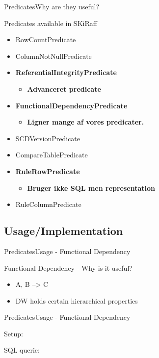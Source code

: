 \begin{frame}{Predicates}{Why are they useful?}
	\begin{block}{Predicates available in SKiRaff}
		\begin{itemize}
			\item<1-> RowCountPredicate
			\item<1-> ColumnNotNullPredicate
			\item<1-> \textbf{ReferentialIntegrityPredicate}
			\begin{itemize}
				\item<1-> \textbf{Advanceret predicate}
			\end{itemize}
			\item<1-> \textbf{FunctionalDependencyPredicate}
			\begin{itemize}
				\item<1-> \textbf{Ligner mange af vores predicater.}
			\end{itemize}
			\item<1-> SCDVersionPredicate
			\item<1-> CompareTablePredicate
			\item<1-> \textbf{RuleRowPredicate}
			\begin{itemize}
				\item<1-> \textbf{Bruger ikke SQL men representation}
			\end{itemize}
			\item<1-> RuleColumnPredicate
		\end{itemize}
	\end{block}
\end{frame}

\subsection{Usage/Implementation }
\begin{frame}{Predicates}{Usage - Functional Dependency}
	\begin{block}{Functional Dependency - Why is it useful?}
		\begin{itemize}
			\item<1-> A, B --> C
			\item<2-> DW holds certain hierarchical properties
		\end{itemize}
	\end{block}
\end{frame}

\begin{frame}{Predicates}{Usage - Functional Dependency}
	\begin{block}{Setup:}
	\end{block}
	\begin{block}{SQL querie:}
	\end{block}
\end{frame}

